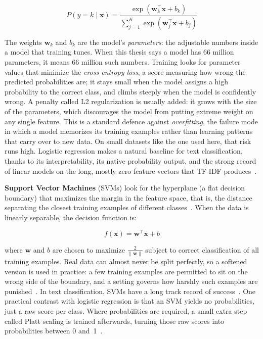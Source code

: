 \begin{equation}
P(y = k \mid \mathbf{x}) = \frac{\exp(\mathbf{w}_k^\top \mathbf{x} + b_k)}{\sum_{j=1}^{K} \exp(\mathbf{w}_j^\top \mathbf{x} + b_j)}
\label{eq:logreg}
\end{equation}

\noindent The weights $\mathbf{w}_k$ and $b_k$ are the model's \emph{parameters}: the adjustable numbers inside a model that training tunes. When this thesis says a model has 66 million parameters, it means 66 million such numbers. Training looks for parameter values that minimize the \emph{cross-entropy loss}, a score measuring how wrong the predicted probabilities are; it stays small when the model assigns a high probability to the correct class, and climbs steeply when the model is confidently wrong. A penalty called L2 regularization is usually added: it grows with the size of the parameters, which discourages the model from putting extreme weight on any single feature. This is a standard defence against \emph{overfitting}, the failure mode in which a model memorizes its training examples rather than learning patterns that carry over to new data. On small datasets like the one used here, that risk runs high. Logistic regression makes a natural baseline for text classification, thanks to its interpretability, its native probability output, and the strong record of linear models on the long, mostly zero feature vectors that TF-IDF produces~\cite{joachims1998text}.

\textbf{Support Vector Machines} (SVMs) look for the hyperplane (a flat decision boundary) that maximizes the margin in the feature space, that is, the distance separating the closest training examples of different classes~\cite{cortes1995support}. When the data is linearly separable, the decision function is:

\begin{equation}
f(\mathbf{x}) = \mathbf{w}^\top \mathbf{x} + b
\label{eq:svm}
\end{equation}

\noindent where $\mathbf{w}$ and $b$ are chosen to maximize $\frac{2}{\|\mathbf{w}\|}$ subject to correct classification of all training examples. Real data can almost never be split perfectly, so a softened version is used in practice: a few training examples are permitted to sit on the wrong side of the boundary, and a setting governs how harshly such examples are punished~\cite{cortes1995support}. In text classification, SVMs have a long track record of success~\cite{joachims1998text}. One practical contrast with logistic regression is that an SVM yields no probabilities, just a raw score per class. Where probabilities are required, a small extra step called Platt scaling is trained afterwards, turning those raw scores into probabilities between 0 and~1~\cite{platt1999probabilistic}.

